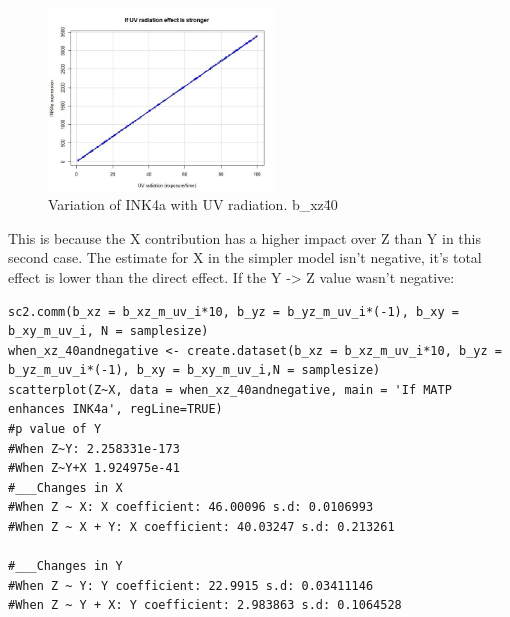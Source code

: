 \documentclass{article}
\begin{document}
\begin{figure}[h]
\caption{Variation of INK4a with UV radiation. b\_xz\=40}
\includegraphics[width=6cm]{scatterplotradiationHIGH.jpeg}
\centering
\end{figure}

This is because the X contribution has a higher impact over Z than Y in this second case. The estimate for X in the simpler model isn't negative, it's total effect is lower than the direct effect. If the Y -> Z value wasn't negative:

\begin{lstlisting}
sc2.comm(b_xz = b_xz_m_uv_i*10, b_yz = b_yz_m_uv_i*(-1), b_xy = b_xy_m_uv_i, N = samplesize)
when_xz_40andnegative <- create.dataset(b_xz = b_xz_m_uv_i*10, b_yz = b_yz_m_uv_i*(-1), b_xy = b_xy_m_uv_i,N = samplesize)
scatterplot(Z~X, data = when_xz_40andnegative, main = 'If MATP enhances INK4a', regLine=TRUE)
#p value of Y
#When Z~Y: 2.258331e-173
#When Z~Y+X 1.924975e-41 
#___Changes in X
#When Z ~ X: X coefficient: 46.00096 s.d: 0.0106993
#When Z ~ X + Y: X coefficient: 40.03247 s.d: 0.213261

#___Changes in Y
#When Z ~ Y: Y coefficient: 22.9915 s.d: 0.03411146
#When Z ~ Y + X: Y coefficient: 2.983863 s.d: 0.1064528
\end{lstlisting}
\end{document}
